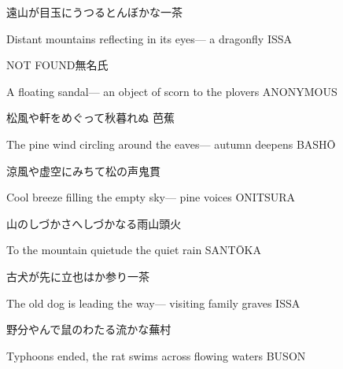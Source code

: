 \begin{haiku}
    {\FH 遠山が目玉にうつるとんぼかな}\hfill{\FH 一茶}

    \vin{} Distant mountains
    \vin{} \vin{} reflecting in its eyes---
    \vin{} \vin{} \vin{} a dragonfly \hspace{\fill} ISSA
\end{haiku}

\begin{haiku}
    {NOT FOUND}\hfill{\FH 無名氏}

    \vin{} A floating sandal---
    \vin{} \vin{} an object of scorn
    \vin{} \vin{} \vin{} to the plovers \hspace{\fill} ANONYMOUS
\end{haiku}

\begin{haiku}
    {\FH 松風や軒をめぐって秋暮れぬ }\hfill{\FH 芭蕉}

    \vin{} The pine wind
    \vin{} \vin{} circling around the eaves---
    \vin{} \vin{} \vin{} autumn deepens \hspace{\fill} BASH\={O}
\end{haiku}

\begin{haiku}
    {\FH 涼風や虚空にみちて松の声}\hfill{\FH 鬼貫}

    \vin{} Cool breeze
    \vin{} \vin{} filling the empty sky---
    \vin{} \vin{} \vin{} pine voices \hspace{\fill} ONITSURA
\end{haiku}

\begin{haiku}
    {\FH 山のしづかさへしづかなる雨}\hfill{\FH 山頭火}

    \vin{} To the mountain quietude
    \vin{} \vin{} the quiet
    \vin{} \vin{} \vin{} rain \hspace{\fill} SANT\={O}KA
\end{haiku}

\begin{haiku}
    {\FH 古犬が先に立也はか参り}\hfill{\FH 一茶}

    \vin{} The old dog
    \vin{} \vin{} is leading the way---
    \vin{} \vin{} \vin{} visiting family graves \hspace{\fill} ISSA
\end{haiku}

\begin{haiku}
    {\FH 野分やんで鼠のわたる流かな}\hfill{\FH 蕪村}

    \vin{} Typhoons ended,
    \vin{} \vin{} the rat swims across
    \vin{} \vin{} \vin{} flowing waters \hspace{\fill} BUSON
\end{haiku}

